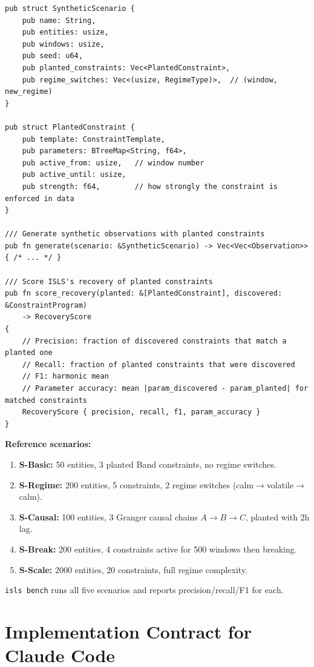 \documentclass[10pt,a4paper]{article}
\begin{document}
\begin{lstlisting}[style=rust]
pub struct SyntheticScenario {
    pub name: String,
    pub entities: usize,
    pub windows: usize,
    pub seed: u64,
    pub planted_constraints: Vec<PlantedConstraint>,
    pub regime_switches: Vec<(usize, RegimeType)>,  // (window, new_regime)
}

pub struct PlantedConstraint {
    pub template: ConstraintTemplate,
    pub parameters: BTreeMap<String, f64>,
    pub active_from: usize,   // window number
    pub active_until: usize,
    pub strength: f64,        // how strongly the constraint is enforced in data
}

/// Generate synthetic observations with planted constraints
pub fn generate(scenario: &SyntheticScenario) -> Vec<Vec<Observation>> { /* ... */ }

/// Score ISLS's recovery of planted constraints
pub fn score_recovery(planted: &[PlantedConstraint], discovered: &ConstraintProgram)
    -> RecoveryScore
{
    // Precision: fraction of discovered constraints that match a planted one
    // Recall: fraction of planted constraints that were discovered
    // F1: harmonic mean
    // Parameter accuracy: mean |param_discovered - param_planted| for matched constraints
    RecoveryScore { precision, recall, f1, param_accuracy }
}
\end{lstlisting}

\textbf{Reference scenarios:}
\begin{enumerate}[nosep]
\item \textbf{S-Basic:} 50 entities, 3 planted Band constraints, no regime switches.
\item \textbf{S-Regime:} 200 entities, 5 constraints, 2 regime switches (calm$\to$volatile$\to$calm).
\item \textbf{S-Causal:} 100 entities, 3 Granger causal chains $A\to B\to C$, planted with 2h lag.
\item \textbf{S-Break:} 200 entities, 4 constraints active for 500 windows then breaking.
\item \textbf{S-Scale:} 2000 entities, 20 constraints, full regime complexity.
\end{enumerate}

\texttt{isls bench} runs all five scenarios and reports precision/recall/F1 for each.

\section{Implementation Contract for Claude Code}
\label{sec:contract}
\end{document}
